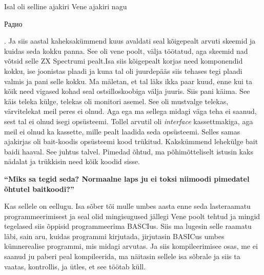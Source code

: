 Isal  oli selline ajakiri Vene ajakiri nagu \begin{russian}Радио\end{russian}. Ja siis aastal kaheksakümmend kuus  avaldati seal kõigepealt arvuti skeemid ja kuidas seda kokku panna. See oli vene poolt, välja töötatud, aga skeemid nad võtsid selle ZX Spectrumi pealt.Isa siis kõigepealt korjas need komponendid kokku, ise joonistas plaadi ja kuna tal oli juurdepääs siis tehases tegi plaadi valmis ja pani selle kokku. Ma mäletan, et tal läks ikka paar kuud, enne kui ta kõik need vigased kohad seal ostsilloskoobiga välja juuris. Siis pani käima. See käis teleka  külge,  telekas oli monitori asemel. See oli mustvalge telekas, värvitelekat  meil peres ei olnud.  Aga ega ma sellega  midagi väga teha ei saanud, sest tal ei olnud isegi opsüsteemi. Tollel arvutil oli \emph{interface} kassettmakiga, aga meil ei olnud ka kassette, mille pealt laadida seda opsüsteemi. Selles samas ajakirjas oli bait-koodis opsüsteemi kood trükitud. Kakskümmend lehekülge bait baidi haaval. See juhtus talvel. Pimedad õhtud, ma põhimõtteliselt istusin kaks nädalat ja trükkisin need kõik koodid sisse.

\textbf{\enquote{Miks sa tegid seda? Normaalne laps ju ei toksi niimoodi pimedatel õhtutel baitkoodi?}}

Kas sellele on eellugu. Isa sõber tõi mulle umbes aasta enne seda lasteraamatu  programmeerimisest ja seal olid mingisugused jällegi Vene poolt tehtud ja mingid tegelased siis õppisid programmeerima BASCIus. Siis ma lugesin selle raamatu läbi, sain aru, kuidas programmi kirjutada, jirjutasin BASICus umbes kümnerealise programmi, mis midagi arvutas. Ja siis kompileerimisee osas, me ei saanud ju paberi peal kompileerida, ma näitasin sellele isa sõbrale ja siis ta vaatas, kontrollis,  ja ütles, et see töötab küll.

